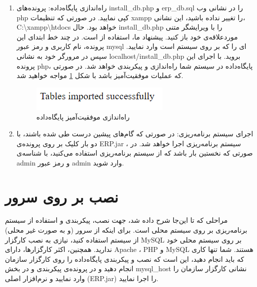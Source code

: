 \begin{enumerate}
		
	\item راه‌اندازی پایگاه‌داده:
	پرونده‌های install\_db.php و erp\_db.sql را در نشانی وب php کپی نمایید. در صورتی که تنظیمات xampp را تغییر نداده باشید، این نشانی، 
	  C:\textbackslash{}xampp\textbackslash{}htdocs خواهد بود. حال install\_db.php را با ویرایشگر متنی موردعلاقه‌ی خود باز کنید. پیشنهاد ما، استفاده از
	است. در چند خط ابتدای این پرونده، نام کاربری و رمز عبور mysql ای را که بر روی سیستم است وارد نمایید.
	 سپس در مرورگر خود به نشانی
	localhost/install\_db.php
	بروید. با اجرای این پرونده php، پایگاه‌داده در سیستم شما راه‌اندازی و پیکربندی خواهد شد. در صورتی که عملیات موفقیت‌آمیز باشد با شکل 
	\ref{f15}
	مواجه خواهید شد.
			\begin{figure}[H]
				\centering
				\includegraphics[scale=0.7]{img/install/db}
				\caption{راه‌اندازی موفقیت‌آمیز پایگاه‌داده}
				\label{f15}
			\end{figure}
	
	\item اجرای سیستم برنامه‌ریزی: 
در صورتی که گام‌های پیشین درست طی شده باشند، با دو بار کلیک بر روی پرونده‌ی ERP.jar ، سیستم برنامه‌ریزی اجرا خواهد شد. در صورتی که نخستین بار باشد که از سیستم برنامه‌ریزی استفاده می‌کنید، با شناسه‌ی admin و رمز عبور admin وارد شوید. 
	
\end{enumerate}

\section{نصب بر روی سرور}
مراحلی که تا این‌جا شرح داده شد، جهت نصب، پیکربندی و استفاده از سیستم برنامه‌ریزی بر روی سیستم محلی است. برای اینکه از سرور (و به صورت غیر محلی) از سیستم استفاده کنید، نیازی به نصب کارگزار  MySQL بر روی سیستم محلی خود ندارید. همچنین، اکثر کارگزارها، دارای Apache ، PHP و  MySQL هستند. شما تنها کاری که باید انجام دهید، این است که نصب و پیکربندی پایگاه‌داده را روی کارگزار سازمان انجام دهید و در پرونده‌ی پیکربندی و در بخش  mysql\_host نشانی کارگزار سازمان را وارد نمایید و نرم‌افزار اصلی (ERP.jar) را اجرا نمایید.

